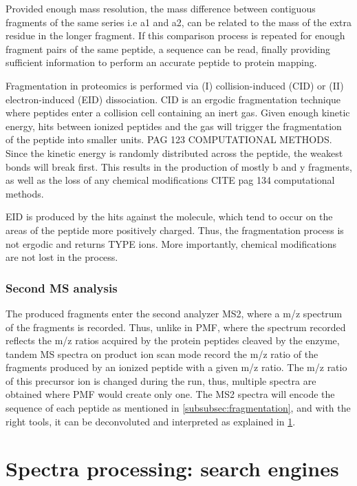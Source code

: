 \documentclass[11pt, a4paper]{report}
\begin{document}
Provided enough mass resolution, the mass difference between contiguous fragments of the same series i.e a1 and a2, can be related to the mass of the extra residue in the longer fragment. If this comparison process is repeated for enough fragment pairs of the same peptide, a sequence can be read, finally providing sufficient information to perform an accurate peptide to protein mapping.

Fragmentation in proteomics is performed via (I) collision-induced (CID) or (II) electron-induced (EID) dissociation. CID is an ergodic fragmentation technique where peptides enter a collision cell containing an inert gas. Given enough kinetic energy, hits between ionized peptides and the gas will trigger the fragmentation of the peptide into smaller units. PAG 123 COMPUTATIONAL METHODS. Since the kinetic energy is randomly distributed across the peptide, the weakest bonds will break first. This results in the production of mostly b and y fragments, as well as the loss of any chemical modifications CITE pag 134 computational methods.

EID is produced by the hits against the molecule, which tend to occur on the areas of the peptide more positively charged. Thus, the fragmentation process is not ergodic and returns TYPE ions. More importantly, chemical modifications are not lost in the process.

\subsubsection{Second MS analysis}

The produced fragments enter the second analyzer \ac{MS2}, where a m/z spectrum of the fragments is recorded. Thus, unlike in PMF, where the spectrum recorded reflects the m/z ratios acquired by the protein peptides cleaved by the enzyme, tandem MS spectra on product ion scan mode record the m/z ratio of the fragments produced by an ionized peptide with a given m/z ratio. The m/z ratio of this precursor ion is changed during the run, thus, multiple spectra are obtained where PMF would create only one. The \ac{MS2} spectra will encode the sequence of each peptide as mentioned in \ref{subsubsec:fragmentation}, and with the right tools, it can be deconvoluted and interpreted as explained in \ref{sec:search_engines}.


\section{Spectra processing: search engines}
\label{sec:search_engines}
\end{document}
